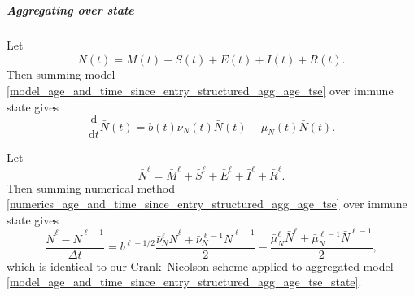 \documentclass[USenglish]{article}
\newcommand{\md}{\mathrm{d}}
\begin{document}
\subparagraph{Aggregating over state}

Let
\begin{equation}
  \bar{N}(t)
  = \bar{M}(t) + \bar{S}(t) + \bar{E}(t)
  + \bar{I}(t) + \bar{R}(t).
\end{equation}
Then summing model
\eqref{model_age_and_time_since_entry_structured_agg_age_tse} over
immune state gives
\begin{equation}
  \label{model_age_and_time_since_entry_structured_agg_age_tse_state}
  \frac{\md}{\md t} \bar{N}(t)
  = b(t) \bar{\nu}_N(t) \bar{N}(t)
  - \bar{\mu}_N(t) \bar{N}(t).
\end{equation}

Let
\begin{equation}
  \bar{N}^{\ell}
  = \bar{M}^{\ell} + \bar{S}^{\ell} + \bar{E}^{\ell}
  + \bar{I}^{\ell} + \bar{R}^{\ell}.
\end{equation}
Then summing numerical method
\eqref{numerics_age_and_time_since_entry_structured_agg_age_tse} over
immune state gives
\begin{equation}
  \label{numerics_age_and_time_since_entry_structured_agg_age_tse_state}
  \frac{\bar{N}^{\ell} - \bar{N}^{\ell - 1}}{\Delta t}
  = b^{\ell - 1 / 2}
  \frac{\bar{\nu}_N^{\ell} \bar{N}^{\ell}
    + \bar{\nu}_N^{\ell - 1} \bar{N}^{\ell - 1}}{2}
  - \frac{\bar{\mu}_N^{\ell} \bar{N}^{\ell}
    + \bar{\mu}_N^{\ell - 1} \bar{N}^{\ell - 1}}{2},
\end{equation}
which is identical to our Crank--Nicolson scheme applied to aggregated
model
\eqref{model_age_and_time_since_entry_structured_agg_age_tse_state}.


\printbibliography
\end{document}
